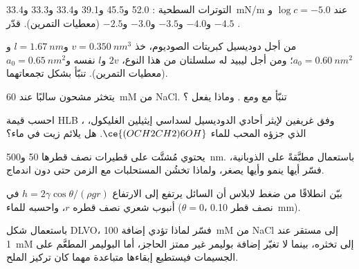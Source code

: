 \begin{exercise}[$\star\star$]\label{exo:b3:colloids:6}
التوترات السطحية : 52.0 و45.5 و39.1 و33.4 و33.3 
و\qty{33.4}{mN/m} عند $\log c = -5.0$ و$-4.5$ و$-4.0$ و$-3.5$ و$-3.0$ و$-2.5$ (معطيات التمرين).
قدّر .
\end{exercise}

\begin{exercise}[$\star\star$]\label{exo:b3:colloids:7}
من أجل دوديسيل كبريتات الصوديوم، خذ $v = \qty{0.350}{nm^3}$ و$l = \qty{1.67}{nm}$ و$a_0 = \qty{0.60}{nm^2}$؛ ومن أجل
ليبيد له سلسلتان من هذا النوع، $2v$ و$l$ نفسه و$a_0 = \qty{0.65}{nm^2}$ (معطيات
التمرين). تنبّأ بشكل تجمعاتهما.
\end{exercise}

\begin{exercise}[$\star\star$]\label{exo:b3:colloids:8}
يتخثر  مشحون سالبًا عند \qty{60}{mM} من NaCl. تنبّأ  مع 
ومع . وماذا يفعل ؟
\end{exercise}

\begin{exercise}[$\star\star$]\label{exo:b3:colloids:9}
احسب قيمة HLB وفق غريفين لإيثر أحادي الدوديسيل لسداسي إيثيلين الغليكول،
، الذي جزؤه المحب للماء $\ce{(OCH2CH2)6OH}$. هل يلائم
 زيت في ماء؟
\end{exercise}

\begin{exercise}[$\star\star\star$]\label{exo:b3:colloids:10}
يحتوي مُشتَّت على قطيرات نصف قطرها 50 و\qty{500}{nm}. باستعمال 
مطبَّقةً على الذوبانية، فسّر أيها ينمو وأيها يصغر، ولماذا
تخشُن المستحلبات مع الزمن حتى دون اندماج.
\end{exercise}

\begin{exercise}[$\star\star\star$]\label{exo:b3:colloids:11}
بيّن انطلاقًا من ضغط لابلاس أن السائل يرتفع إلى الارتفاع $h = 2\gamma\cos\theta/(\rho gr)$ في
أنبوب شعري نصف قطره $r$، واحسبه للماء ($\theta = 0$، نصف قطر \qty{0.10}{mm}).
\end{exercise}

\begin{exercise}[$\star\star\star$]\label{exo:b3:colloids:12}
باستعمال شكل DLVO، فسّر لماذا تؤدي إضافة \qty{100}{mM} من NaCl إلى  مستقر عند \qty{1}{mM}
إلى تخثره، بينما لا تغيّر إضافة بوليمر غير ممتز
الحاجز، أما البوليمر المطعَّم على الجسيمات فيستطيع إبقاءها متباعدة مهما كان تركيز
الملح.
\end{exercise}

